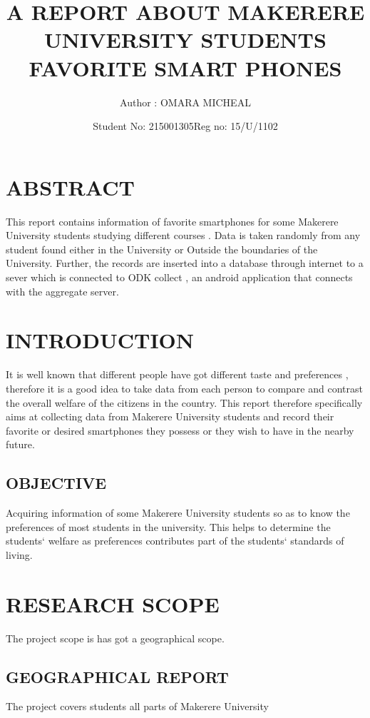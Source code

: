 \documentclass{article}
\begin{document}
		\title{A REPORT ABOUT  MAKERERE UNIVERSITY STUDENTS FAVORITE SMART PHONES}
		\author{Author :  OMARA MICHEAL }
		\date{Student No: 215001305}
                      \date{Reg no: 15/U/1102}
		\maketitle
	

	\tableofcontents

\section{ABSTRACT}
This report contains information of favorite smartphones for some Makerere University students studying different courses . Data is taken randomly from any student found either in the University or Outside the boundaries of the University. Further, the records are inserted into a database through internet to a sever which is connected to ODK collect , an android application that connects with the aggregate server.


\section{INTRODUCTION}

It is well known that different people have got different taste and preferences , therefore it is a good idea to take data from each person to compare and contrast the overall welfare of the citizens in the country. This report therefore specifically aims at collecting data from Makerere University students and record their favorite or desired smartphones they possess or they wish to have in the nearby future.

\subsection{OBJECTIVE}

Acquiring information of some Makerere University students so as to know the preferences of most students in the university. This helps to determine the students` welfare as preferences contributes part of the students` standards of living.

\section{RESEARCH SCOPE}
The project scope is has got a geographical scope.
\subsection{GEOGRAPHICAL REPORT}
The project covers students all parts of Makerere University
\end{document}
